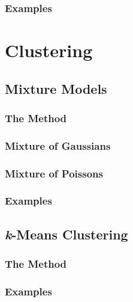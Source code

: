 \documentclass[11pt, oneside]{book}
\begin{document}

\subsection{Examples}



\chapter{Clustering}

\section{Mixture Models}

\subsection{The Method}


\subsection{Mixture of Gaussians}


\subsection{Mixture of Poissons}


\subsection{Examples}


\section{\textit{k}-Means Clustering}

\subsection{The Method}


\subsection{Examples}
\end{document}
